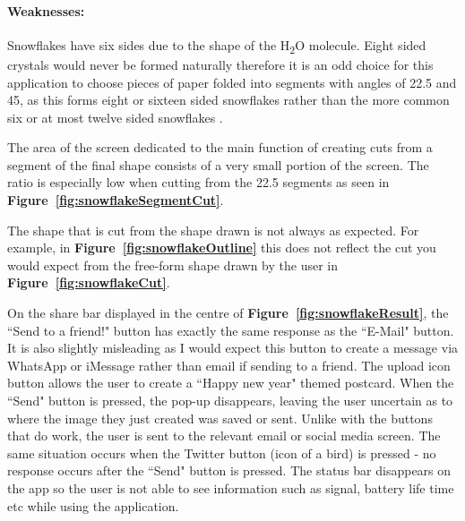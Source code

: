 \documentclass[11pt]{article}
\begin{document}
                \paragraph{Weaknesses:}
                Snowflakes have six sides due to the shape of the H\textsubscript{2}O molecule. Eight sided crystals would never be formed naturally therefore it is an odd choice for this application to choose pieces of paper folded into segments with angles of 22.5\textdegree{} and 45\textdegree{}, as this forms eight or sixteen sided snowflakes rather than the more common six or at most twelve sided snowflakes \cite{H2O}. 
                
                The area of the screen dedicated to the main function of creating cuts from a segment of the final shape consists of a very small portion of the screen. The ratio is especially low when cutting from the 22.5\textdegree{} segments as seen in \textbf{Figure~\ref{fig:snowflakeSegmentCut}}.
                
                The shape that is cut from the shape drawn is not always as expected. For example, in \textbf{Figure~\ref{fig:snowflakeOutline}} this does not reflect the cut you would expect from the free-form shape drawn by the user in \textbf{Figure~\ref{fig:snowflakeCut}}.
               
                On the share bar displayed in the centre of \textbf{Figure~\ref{fig:snowflakeResult}}, the ``Send to a friend!" button has exactly the same response as the ``E-Mail" button. It is also slightly  misleading as I would expect this button to create a message via WhatsApp or iMessage rather than email if sending to a friend. The upload icon button allows the user to create a ``Happy new year" themed postcard. When the ``Send" button is pressed, the pop-up disappears, leaving the user uncertain as to where the image they just created was saved or sent. Unlike with the buttons that do work, the user is sent to the relevant email or social media screen. The same situation occurs when the Twitter button (icon of a bird) is pressed - no response occurs after the ``Send" button is pressed.
                The status bar disappears on the app so the user is not able to see information such as signal, battery life time etc while using the application. 
                 
\end{document}

